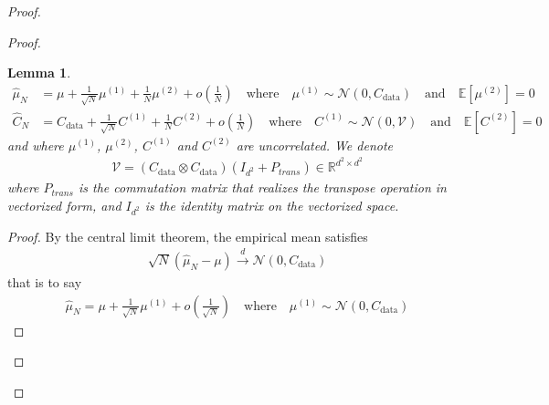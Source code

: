 \documentclass[11pt]{article}
\newtheorem{lem}{Lemma}
\newcommand{\RR}{\mathbb{R}}
\newcommand{\EE}{\mathbb{E}}
\begin{document}
\begin{proof}
\begin{proof}
\begin{lem}
\begin{align}
\hat  \mu_N &= \mu + \frac{1}{\sqrt{N}} \mu^{(1)} + \frac{1}{N}\mu^{(2)} + o\left(\frac{1}{N}\right) \quad \text{where} \quad \mu^{(1)} \sim \mathcal{N} (0, C_\mathrm{data}) \quad \text{and} \quad \EE[\mu^{(2)}] = 0 \\
 \label{eq:CN}
\hat C_N &=  C_\mathrm{data} + \frac{1}{\sqrt{N}}   C^{(1)} + \frac{1}{N}   C^{(2)} + o\left( \frac{1}{N}\right) \quad \text{where} \quad   C^{(1)} \sim \mathcal{N} (0, \mathcal{V}) \quad \text{and} \quad \EE[  C^{(2)}] = 0
\end{align}
and where $\mu^{(1)}$, $\mu^{(2)}$, $C^{(1)}$ and $C^{(2)}$ are uncorrelated. We denote
\begin{align*}
    \mathcal{V} = (C_\mathrm{data} \otimes C_\mathrm{data})  ( I_{d^2} + P_{trans}) \in \RR^{d^2 \times d^2}
\end{align*}
where $P_{trans}$ is the commutation matrix that realizes the transpose operation in vectorized form, and $ I_{d^2}$ is the identity matrix on the vectorized space.
\end{lem}
\begin{proof}
By the central limit theorem, the empirical mean satisfies 
\begin{align*}
    \sqrt{N}  (\hat\mu_N - \mu)  \xrightarrow{d} \mathcal{N}(0, C_\mathrm{data}) %
\end{align*}
that is to say 
\begin{align*} 
\hat \mu_N = \mu + \frac{1}{\sqrt{N}} \mu^{(1)} + o\left(\frac{1}{\sqrt{N}}\right) \quad \text{where} \quad \mu^{(1)} \sim \mathcal{N} (0, C_\mathrm{data})
\end{align*}


\end{proof}
\end{proof}
\end{proof}
\end{document}
